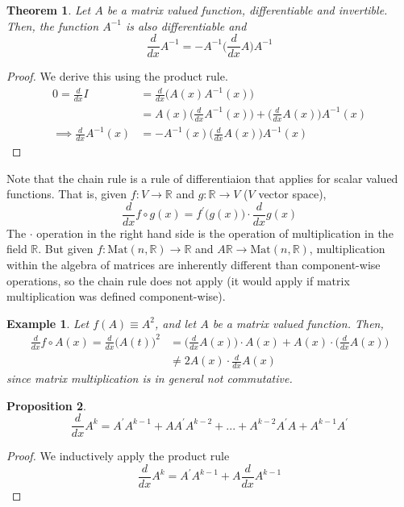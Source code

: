 \documentclass{article}
\newtheorem{theorem}{Theorem}[section]
\newtheorem{proposition}[theorem]{Proposition}
\newtheorem{example}{Example}[section]
\theoremstyle{remark}
\theoremstyle{definition}
\begin{document}
    \begin{theorem}
    Let $A$ be a matrix valued function, differentiable and invertible. Then, the function $A^{-1}$ is also differentiable and 
    \[\frac{d}{d x} A^{-1} = - A^{-1} \bigg( \frac{d}{d x} A \bigg) A^{-1}\]
    \end{theorem}
    \begin{proof}
    We derive this using the product rule. 
    \begin{align*}
        0 = \frac{d}{d x} I & = \frac{d}{d x} \big( A(x) A^{-1} (x) \big) \\
        & = A(x) \bigg(\frac{d}{d x} A^{-1} (x) \bigg) + \bigg( \frac{d}{d x} A(x) \bigg) A^{-1} (x) \\
        \implies \frac{d}{d x} A^{-1} (x) & = - A^{-1} (x) \bigg( \frac{d}{d x} A(x) \bigg) A^{-1}(x)
    \end{align*}
    \end{proof}
    Note that the chain rule is a rule of differentiaion that applies for scalar valued functions. That is, given $f: V \longrightarrow \mathbb{R}$ and $g: \mathbb{R} \longrightarrow V$ ($V$ vector space), 
    \[\frac{d}{d x} f \circ g (x) = f^\prime \big( g(x) \big) \cdot \frac{d}{d x} g(x)\]
    The $\cdot$ operation in the right hand side is the operation of multiplication in the field $\mathbb{R}$. But given $f: \text{Mat}(n, \mathbb{R}) \longrightarrow \mathbb{R}$ and $A \mathbb{R} \longrightarrow \text{Mat}(n, \mathbb{R})$, multiplication within the algebra of matrices are inherently different than component-wise operations, so the chain rule does not apply (it would apply if matrix multiplication was defined component-wise). 

    \begin{example}
    Let $f(A) \equiv A^2$, and let $A$ be a matrix valued function. Then, 
    \begin{align*}
        \frac{d}{d x} f \circ A(x) = \frac{d}{d x} \big( A(t) \big)^2 & = \bigg( \frac{d}{d x} A(x) \bigg) \cdot A(x) + A(x) \cdot \bigg( \frac{d}{d x} A(x) \bigg) \\
        & \neq 2 A(x) \cdot \frac{d}{d x} A(x)
    \end{align*}
    since matrix multiplication is in general not commutative. 
    \end{example}

    \begin{proposition}
    \[\frac{d}{d x} A^k = A^\prime A^{k-1} + A A^\prime A^{k-2} + ... + A^{k-2} A^\prime A + A^{k-1} A^\prime\]
    \end{proposition}
    \begin{proof}
    We inductively apply the product rule
    \[\frac{d}{d x} A^k = A^\prime A^{k-1} + A \frac{d}{d x} A^{k-1}\]
    \end{proof}
\end{document}
